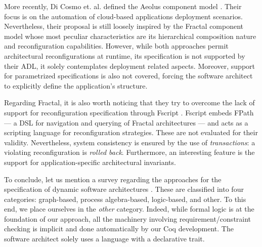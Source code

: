 		More recently, 	Di Cosmo et. al. defined the Aeolus component model \cite{conf/sefm/CosmoZZ12}. Their focus
	is on the automation of cloud-based applications deployment scenarios. Nevertheless, their 
    proposal is still loosely inspired by the Fractal component model \cite{fractalSpec} whose
	most peculiar characteristics are its hierarchical composition nature and reconfiguration capabilities.
	However, while both approaches permit architectural reconfigurations at runtime, 
    its specification is not supported by their ADL, it solely contemplates deployment related
    aspects. Moreover, support for
	parametrized specifications is also not covered, forcing the software architect to explicitly 	
	define the application's structure.    
	
		Regarding Fractal,  it is also worth noticing that they try to overcome the lack of
	support for reconfiguration specification	 through 
	Fscript \cite{DAVID:2008:HAL-00468474:1}. Fscript embeds FPath --- a DSL for navigation and querying of
	Fractal architectures --- and acts as a scripting language for reconfiguration strategies. These
	are not evaluated for their validity. Nevertheless, system consistency is ensured by the use of
	\textit{transactions}: a violating reconfiguration is \textit{rolled back}.
	Furthermore, an interesting feature is the support for application-specific architectural
	invariants.


		To conclude, let us mention a survey regarding the approaches for the specification of 
	dynamic software architectures \cite{Bradbury:2004:SSD:1075405.1075411}. These are 
	classified into four categories: graph-based, process algebra-based, 
	logic-based, and other. To this end, we place ourselves
	in the \textit{other} category. Indeed, while formal logic is at the foundation of 
	our approach, all the machinery involving requirement/constraint checking is 
	implicit and done automatically by our Coq development. The software architect 
	solely uses a language with a declarative trait. %
	
	
	
		
	
		
	
	
	
    
    






